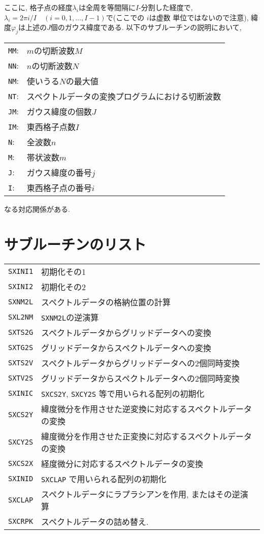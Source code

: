 \documentclass[a4j]{jsarticle}
\begin{document}
ここに, 格子点の経度$\lambda_i$は全周を等間隔に$I$-分割した経度で,
$\lambda_i=2\pi i/I\quad (i=0,1,\ldots,I-1)$で(ここでの $i$は虚数
単位ではないので注意),
緯度$\varphi_j$は上述の$J$個のガウス緯度である.
以下のサブルーチンの説明において,
\begin{center}
\begin{tabular}{ll}
\texttt{MM}:& $m$の切断波数$M$\\
\texttt{NN}:& $n$の切断波数$N$\\
\texttt{NM}:& 使いうる$N$の最大値\\
\texttt{NT}:& スペクトルデータの変換プログラムにおける切断波数\\
\texttt{JM}:& ガウス緯度の個数$J$\\
\texttt{IM}:& 東西格子点数$I$\\
\texttt{N}:& 全波数$n$\\
\texttt{M}:& 帯状波数$m$\\
\texttt{J}:& ガウス緯度の番号$j$\\
\texttt{I}:& 東西格子点の番号$i$
\end{tabular}
\end{center}
なる対応関係がある.


\section{サブルーチンのリスト}

\vspace{1em}
\begin{tabular}{ll}
\texttt{SXINI1} & 初期化その1\\
\texttt{SXINI2} & 初期化その2\\  
\texttt{SXNM2L} & スペクトルデータの格納位置の計算\\
\texttt{SXL2NM} & \texttt{SXNM2L}の逆演算\\
\texttt{SXTS2G} & スペクトルデータからグリッドデータへの変換\\
\texttt{SXTG2S} & グリッドデータからスペクトルデータへの変換\\
\texttt{SXTS2V} & スペクトルデータからグリッドデータへの2個同時変換\\
\texttt{SXTV2S} & グリッドデータからスペクトルデータへの2個同時変換\\
\texttt{SXINIC} & \texttt{SXCS2Y}, \texttt{SXCY2S} 等で用いられる配列の初期化\\
\texttt{SXCS2Y} & 緯度微分を作用させた逆変換に対応するスペクトルデータの変換\\
\texttt{SXCY2S} & 緯度微分を作用させた正変換に対応するスペクトルデータの変換\\
\texttt{SXCS2X} & 経度微分に対応するスペクトルデータの変換\\
\texttt{SXINID} & \texttt{SXCLAP} で用いられる配列の初期化\\
\texttt{SXCLAP} & スペクトルデータにラプラシアンを作用, またはその逆演算\\
\texttt{SXCRPK} & スペクトルデータの詰め替え.
\end{tabular}
\end{document}

